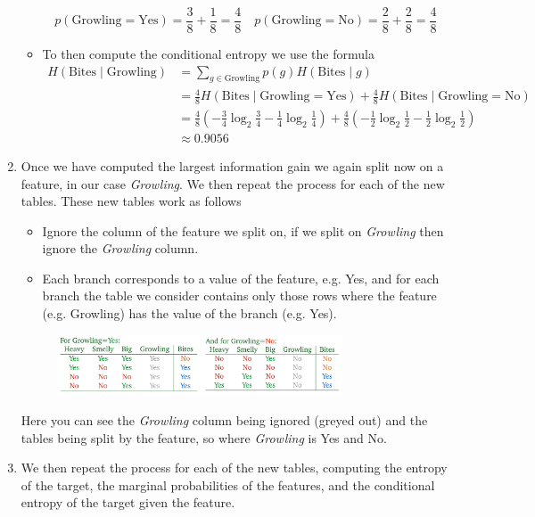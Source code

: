 \documentclass[12pt]{article}
\begin{document}
\begin{enumerate}
\begin{itemize}
\[            p(\text{Growling} = \text{Yes}) = \frac{3}{8} + \frac{1}{8} = \frac{4}{8} \quad
            p(\text{Growling} = \text{No}) = \frac{2}{8} + \frac{2}{8} = \frac{4}{8}
        \]
        \item To then compute the conditional entropy we use the formula
        \begin{align*}
            H(\text{Bites}\mid \text{Growling}) &= \sum_{g\in \text{Growling}}p(g)H(\text{Bites}\mid g) \\
            &= \frac{4}{8}H(\text{Bites}\mid \text{Growling} = \text{Yes}) + \frac{4}{8}H(\text{Bites}\mid \text{Growling} = \text{No}) \\
            &= \frac{4}{8}\left(-\frac{3}{4}\log_2\frac{3}{4} - \frac{1}{4}\log_2\frac{1}{4}\right) + \frac{4}{8}\left(-\frac{1}{2}\log_2\frac{1}{2} - \frac{1}{2}\log_2\frac{1}{2}\right) \\
            &\approx 0.9056
        \end{align*}
    \end{itemize}
    \item Once we have computed the largest information gain we again split now on a feature, in our case \textit{Growling}. We then repeat the process for each of the new tables. These new tables work as follows 
    \begin{itemize}
        \item Ignore the column of the feature we split on, if we split on \textit{Growling} then ignore the \textit{Growling} column.
        \item Each branch corresponds to a value of the feature, e.g. Yes, and for each branch the table we consider contains only those rows where the feature (e.g. Growling) has the value of the branch (e.g. Yes).
    \end{itemize}
    \begin{figure}[!h]
        \centering
        \includegraphics[width=0.8\textwidth]{assets/dt3.png}
    \end{figure} 
    Here you can see the \textit{Growling} column being ignored (greyed out) and the tables being split by the feature, so where \textit{Growling} is Yes and No.
    \item We then repeat the process for each of the new tables, computing the entropy of the target, the marginal probabilities of the features, and the conditional entropy of the target given the feature.
\end{enumerate}
\end{document}
